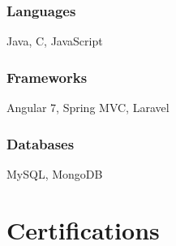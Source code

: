 \documentclass[12pt]{res} %
\begin{document}
\begin{resume}
          \begin{multicols}{3}

            \subsubsection{Languages}
            \vspace{-22pt}
            Java, C, JavaScript
            \vspace{-28pt}

            \subsubsection{Frameworks}
            \vspace{-22pt}
            Angular 7, Spring MVC, Laravel
            \vspace{-28pt}

            \subsubsection{Databases}
            \vspace{-22pt}
            MySQL, MongoDB
            \vspace{-28pt}


            \vspace{-10pt}

          \end{multicols}
        \vspace{-24pt}

      \section{Certifications} 

      \vspace{0pt}

            

\end{resume}
\end{document}
